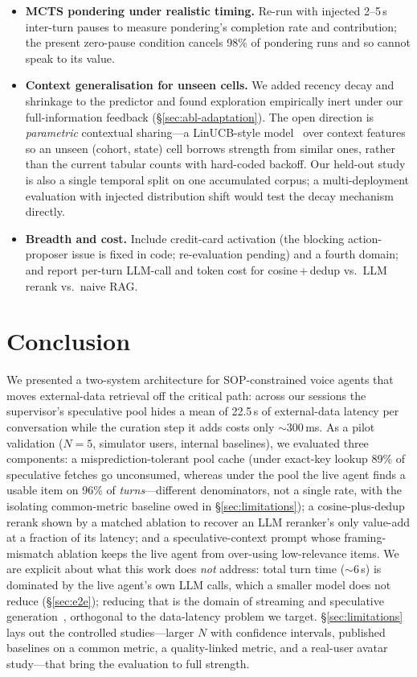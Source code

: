 \documentclass[10pt,twocolumn]{article}
\begin{document}
\begin{itemize}[leftmargin=*, itemsep=3pt]
\item \textbf{MCTS pondering under realistic timing.} Re-run with injected 2--5\,s inter-turn pauses to measure pondering's completion rate and contribution; the present zero-pause condition cancels 98\% of pondering runs and so cannot speak to its value.
\item \textbf{Context generalisation for unseen cells.} We added recency decay and shrinkage to the predictor and found exploration empirically inert under our full-information feedback (\S\ref{sec:abl-adaptation}). The open direction is \emph{parametric} contextual sharing---a LinUCB-style model~\cite{licontextual2010} over context features so an unseen (cohort, state) cell borrows strength from similar ones, rather than the current tabular counts with hard-coded backoff. Our held-out study is also a single temporal split on one accumulated corpus; a multi-deployment evaluation with injected distribution shift would test the decay mechanism directly.
\item \textbf{Breadth and cost.} Include credit-card activation (the blocking action-proposer issue is fixed in code; re-evaluation pending) and a fourth domain; and report per-turn LLM-call and token cost for cosine\,+\,dedup vs.\ LLM rerank vs.\ naive RAG.
\end{itemize}

\section{Conclusion}

We presented a two-system architecture for SOP-constrained voice agents that moves external-data retrieval off the critical path: across our sessions the supervisor's speculative pool hides a mean of 22.5\,s of external-data latency per conversation while the curation step it adds costs only $\sim$300\,ms. As a pilot validation ($N{=}5$, simulator users, internal baselines), we evaluated three components: a misprediction-tolerant pool cache (under exact-key lookup 89\% of speculative fetches go unconsumed, whereas under the pool the live agent finds a usable item on 96\% of \emph{turns}---different denominators, not a single rate, with the isolating common-metric baseline owed in \S\ref{sec:limitations}); a cosine-plus-dedup rerank shown by a matched ablation to recover an LLM reranker's only value-add at a fraction of its latency; and a speculative-context prompt whose framing-mismatch ablation keeps the live agent from over-using low-relevance items. We are explicit about what this work does \emph{not} address: total turn time ($\sim$6\,s) is dominated by the live agent's own LLM calls, which a smaller model does not reduce (\S\ref{sec:e2e}); reducing that is the domain of streaming and speculative generation~\cite{lts2026,relays2s2026}, orthogonal to the data-latency problem we target. \S\ref{sec:limitations} lays out the controlled studies---larger $N$ with confidence intervals, published baselines on a common metric, a quality-linked metric, and a real-user avatar study---that bring the evaluation to full strength.
\end{document}

